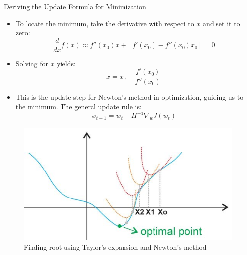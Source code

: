 \documentclass[serif, aspectratio=169]{beamer}
\begin{document}
\begin{frame}{Deriving the Update Formula for Minimization}
\begin{minipage}{0.7\linewidth}
    \begin{itemize}
        \item To locate the minimum, take the derivative with respect to \( x \) and set it to zero:
        \[
        \frac{d}{dx} f(x) \approx f''(x_0)x + [f'(x_0) - f''(x_0)x_0] = 0
        \]
        \item Solving for \( x \) yields:
        \[
        x = x_0 - \frac{f'(x_0)}{f''(x_0)}
        \]
        \item This is the update step for Newton’s method in optimization, guiding us to the minimum. The general update rule is:
        \[
        w_{t+1} = w_t - H^{-1} \nabla_w J(w_t)
        \]
    \end{itemize}
\end{minipage}%
\begin{minipage}{0.3\linewidth}
    \begin{figure}
        \centering
        \includegraphics[width=1.2\linewidth]{pic/newton_ardianumam.jpg}
        \caption{Finding root using Taylor's expansion and Newton's method}
    \end{figure}
\end{minipage}

\end{frame}
\end{document}
